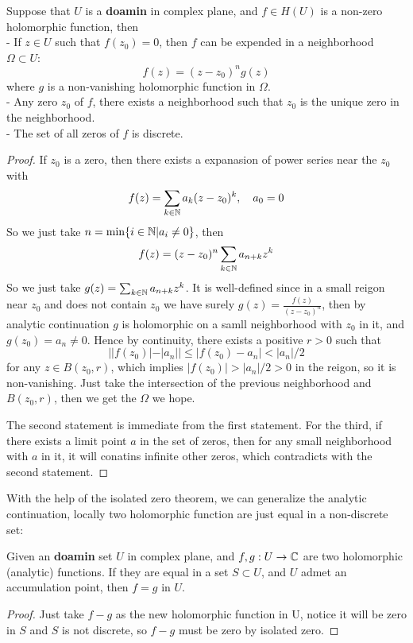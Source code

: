 \begin{theorem}
        Suppose that \(U\) is a \textbf{doamin} in complex plane, and \(f \in H(U)\) is a non-zero holomorphic function, then\\
        - If \(z \in U\) such that \(f(z_0) = 0\), then \(f\) can be expended in a neighborhood \(\Omega \subset U\):
        \[f(z) = (z-z_0)^ng(z)\]
        where \(g\) is a non-vanishing holomorphic function in \(\Omega\). \\
        - Any zero \(z_0\) of \(f\), there exists a neighborhood such that \(z_0\) is the unique zero in the neighborhood. \\
        - The set of all zeros of \(f\) is discrete.

    \begin{proof}
            If \(z_0\) is a zero, then there exists a expanasion of power series near the \(z_0\) with 
            \[f(z) = \sum_{k \in \mathbb{N}}a_k(z-z_0)^k, \quad a_0 =0\]
            So we just take \(n = \min\{i \in \mathbb{N}| a_i \neq 0\}\), then 
            \[f(z) = (z-z_0)^n\sum_{k \in \mathbb{N}}a_{n+k}z^k\]
            So we just take \(g(z) = \sum_{k \in \mathbb{N}}a_{n+k}z^k\). It is well-defined since in a small reigon near \(z_0\) and does not contain \(z_0\) we have surely \(g(z) = \frac{f(z)}{(z-z_0)^n}\), then by analytic continuation \(g\) is holomorphic on a samll neighborhood with \(z_0\) in it, and \(g(z_0) = a_n \neq 0\). Hence by continuity, there exists a positive \(r>0\) such that 
            \[||f(z_0)|-|a_n|| \leq |f(z_0)-a_n| < |a_n| /2\]
            for any \(z \in B(z_0,r)\), which implies \(|f(z_0)| > |a_n|/2 > 0\) in the reigon, so it is non-vanishing. Just take the intersection of the previous neighborhood and \(B(z_0,r)\), then we get the \(\Omega\) we hope.

            The second statement is immediate from the first statement. For the third, if there exists a limit point \(a\) in the set of zeros, then for any small neighborhood with \(a\) in it, it will conatins infinite other zeros, which contradicts with the second statement.
    \end{proof}
\end{theorem}

    With the help of the isolated zero theorem, we can generalize the analytic continuation, locally two holomorphic function are just equal in a non-discrete set:

    \begin{theorem}
        Given an \textbf{doamin} set \(U\) in complex plane, and \(f,g: U \to \mathbb{C}\) are two holomorphic (analytic) functions. If they are equal in a set \(S \subset U\), and \(U\) admet an accumulation point, then \(f=g\) in \(U\).

        \begin{proof}
            Just take \(f-g\) as the new holomorphic function in U, notice it will be zero in \(S\) and \(S\) is not discrete, so \(f-g\) must be zero by isolated zero.
        \end{proof}
    \end{theorem}

